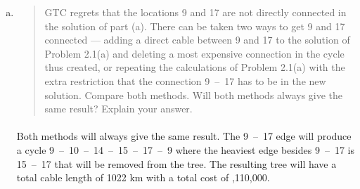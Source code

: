 \begin{enumerate}[(a)]
\begin{figure}[H]
	\centering
	\begin{multicols}{5}
(1,~2), (1,~3), (3,~4), (4,~10), (5,~6), (5,~8), (6,~7), (8,~9), (9,~10), (10,~14), (11,~12), (11,~13), (12,~25), (13,~21), (14,~15), (14,~21), (15,~17), (16,~17), (18,~19), (19,~32), (20,~24), (21,~22), (22,~23), (22,~24), (23,~26), (24,~30), (26,~27), (27,~28), (28,~40), (29,~39), (30,~31), (31,~32), (31,~34), (32,~33), (34,~35), (34,~37), (36,~37), (36,~38), (36,~48), (38,~46), (38,~47), (39,~40), (39,~45), (40,~41), (41,~42), (43,~44), (44,~45), (48,~49), (49,~50)
	\end{multicols}
	\caption{List of connections in a minimum cost communication system}
	\label{mst1}
\end{figure}

\item \begin{quote}GTC regrets that the locations 9 and 17 are not directly connected in the solution
of part (a). There can be taken two ways to get 9 and 17 connected --- adding
a direct cable between 9 and 17 to the solution of Problem 2.1(a) and deleting a
most expensive connection in the cycle thus created, or repeating the calculations
of Problem 2.1(a) with the extra restriction that the connection 9~--~17 has to be
in the new solution. Compare both methods. Will both methods always give the
same result? Explain your answer.\end{quote}

\paragraph{}
	Both methods will always give the same result. The 9~--~17 edge will produce a cycle 9~--~10~--~14~--~15~--~17~--~9 where the heaviest edge besides 9~--~17 is 15~--~17 that will be removed from the tree. The resulting tree will have a total cable length of 1022 km with a total cost of ,110,000.


\end{enumerate}
